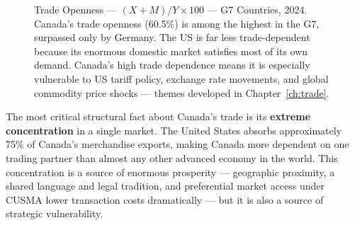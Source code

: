 \begin{figure}[H]
\centering
{}
\caption{Trade Openness --- $(X+M)/Y \times 100$ --- G7 Countries, 2024.
Canada's trade openness (60.5\%) is among the highest in the G7, surpassed
only by Germany. The US is far less trade-dependent because its enormous
domestic market satisfies most of its own demand. Canada's high trade
dependence means it is especially vulnerable to US tariff policy, exchange
rate movements, and global commodity price shocks --- themes developed in
Chapter~\ref{ch:trade}.}
\label{fig:trade_openness}
\end{figure}

The most critical structural fact about Canada's trade is its \textbf{extreme
concentration} in a single market. The United States absorbs approximately
75\% of Canada's merchandise exports, making Canada more dependent on one
trading partner than almost any other advanced economy in the world. This
concentration is a source of enormous prosperity --- geographic proximity,
a shared language and legal tradition, and preferential market access under
CUSMA lower transaction costs dramatically --- but it is also a source of
strategic vulnerability.


